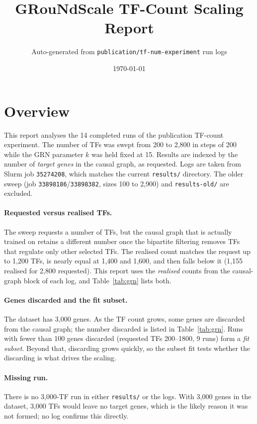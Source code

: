 \documentclass[11pt]{article}
\title{GRouNdScale TF-Count Scaling Report}
\author{Auto-generated from \texttt{publication/tf-num-experiment} run logs}
\date{\today}
\begin{document}
\maketitle
\section{Overview}
This report analyses the 14 completed runs of the publication TF-count experiment. The number of TFs was swept from 200 to 2,800 in steps of 200 while the GRN parameter $k$ was held fixed at 15. Results are indexed by the number of \emph{target genes} in the causal graph, as requested. Logs are taken from Slurm job \texttt{35274208}, which matches the current \texttt{results/} directory. The older sweep (job \texttt{33898186}/\texttt{33898382}, sizes 100 to 2,900) and \texttt{results-old/} are excluded.
\paragraph{Requested versus realised TFs.} The sweep requests a number of TFs, but the causal graph that is actually trained on retains a different number once the bipartite filtering removes TFs that regulate only other selected TFs. The realised count matches the request up to 1,200 TFs, is nearly equal at 1,400 and 1,600, and then falls below it (1,155 realised for 2,800 requested). This report uses the \emph{realised} counts from the causal-graph block of each log, and Table~\ref{tab:grn} lists both.
\paragraph{Genes discarded and the fit subset.} The dataset has 3,000 genes. As the TF count grows, some genes are discarded from the causal graph; the number discarded is listed in Table~\ref{tab:grn}. Runs with fewer than 100 genes discarded (requested TFs 200--1800, 9 runs) form a \emph{fit subset}. Beyond that, discarding grows quickly, so the subset fit tests whether the discarding is what drives the scaling.
\paragraph{Missing run.} There is no 3,000-TF run in either \texttt{results/} or the logs. With 3,000 genes in the dataset, 3,000 TFs would leave no target genes, which is the likely reason it was not formed; no log confirms this directly.
\end{document}
